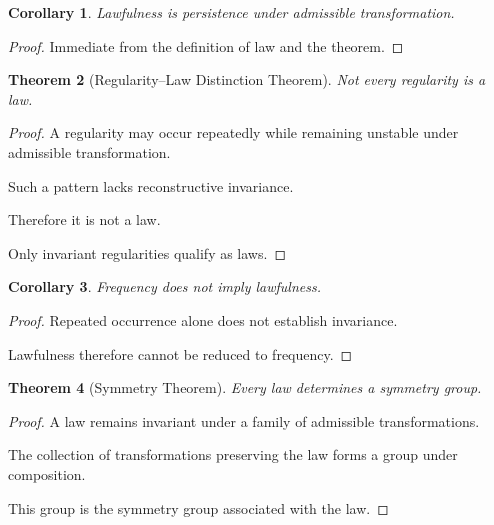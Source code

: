 \documentclass[12pt,oneside]{article}
\newtheorem{theorem}{Theorem}[section] \newtheorem{lemma}[theorem]{Lemma} \newtheorem{proposition}[theorem]{Proposition} \newtheorem{corollary}[theorem]{Corollary}
\theoremstyle{definition}
\begin{document}
\begin{corollary}

Lawfulness is persistence under admissible transformation.

\end{corollary}

\begin{proof}

Immediate from the definition of law and the theorem.

\end{proof}

\begin{theorem}[Regularity–Law Distinction Theorem]

Not every regularity is a law.

\end{theorem}

\begin{proof}

A regularity may occur repeatedly while remaining unstable under admissible transformation.

Such a pattern lacks reconstructive invariance.

Therefore it is not a law.

Only invariant regularities qualify as laws.

\end{proof}

\begin{corollary}

Frequency does not imply lawfulness.

\end{corollary}

\begin{proof}

Repeated occurrence alone does not establish invariance.

Lawfulness therefore cannot be reduced to frequency.

\end{proof}

\begin{theorem}[Symmetry Theorem]

Every law determines a symmetry group.

\end{theorem}

\begin{proof}

A law remains invariant under a family of admissible transformations.

The collection of transformations preserving the law forms a group under composition.

This group is the symmetry group associated with the law.

\end{proof}
\end{document}
